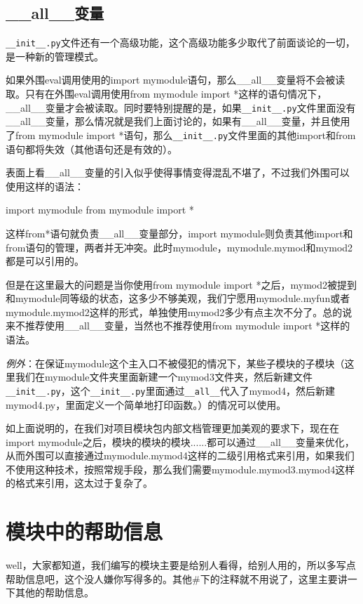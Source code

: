 \documentclass[12pt,oneside]{book}
\begin{document}
\begin{common-format}
\subsection{\_{}\_{}all\_{}\_{}变量}
\verb+__init__.py+文件还有一个高级功能，这个高级功能多少取代了前面谈论的一切，是一种新的管理模式。

如果外围eval调用使用的import mymodule语句，那么\_{}\_{}all\_{}\_{}变量将不会被读取。只有在外围eval调用使用from mymodule import *这样的语句情况下，\_{}\_{}all\_{}\_{}变量才会被读取。同时要特别提醒的是，如果\verb+__init__.py+文件里面没有\_{}\_{}all\_{}\_{}变量，那么情况就是我们上面讨论的，如果有\_{}\_{}all\_{}\_{}变量，并且使用了from mymodule import *语句，那么\verb+__init__.py+文件里面的其他import和from语句都将失效（其他语句还是有效的）。

表面上看\_{}\_{}all\_{}\_{}变量的引入似乎使得事情变得混乱不堪了，不过我们外围可以使用这样的语法：
\begin{tcbpython}[]
import mymodule
from mymodule import *
\end{tcbpython}
这样from*语句就负责\_{}\_{}all\_{}\_{}变量部分，import mymodule则负责其他import和from语句的管理，两者并无冲突。此时mymodule，mymodule.mymod和mymod2都是可以引用的。

但是在这里最大的问题是当你使用from mymodule import *之后，mymod2被提到和mymodule同等级的状态，这多少不够美观，我们宁愿用mymodule.myfun或者mymodule.mymod2这样的形式，单独使用mymod2多少有点主次不分了。总的说来不推荐使用\_{}\_{}all\_{}\_{}变量，当然也不推荐使用from mymodule import *这样的语法。

\emph{例外}：在保证mymodule这个主入口不被侵犯的情况下，某些子模块的子模块（这里我们在mymodule文件夹里面新建一个mymod3文件夹，然后新建文件\verb+__init__.py+，这个\verb+__init__.py+里面通过\verb+__all__+代入了mymod4，然后新建mymod4.py，里面定义一个简单地打印函数。）的情况可以使用。

如上面说明的，在我们对项目模块包内部文档管理更加美观的要求下，现在在import mymodule之后，模块的模块的模块......都可以通过\_{}\_{}all\_{}\_{}变量来优化，从而外围可以直接通过mymodule.mymod4这样的二级引用格式来引用，如果我们不使用这种技术，按照常规手段，那么我们需要mymodule.mymod3.mymod4这样的格式来引用，这太过于复杂了。


\section{模块中的帮助信息}
well，大家都知道，我们编写的模块主要是给别人看得，给别人用的，所以多写点帮助信息吧，这个没人嫌你写得多的。其他\#{}下的注释就不用说了，这里主要讲一下其他的帮助信息。


\end{common-format}
\end{document}
